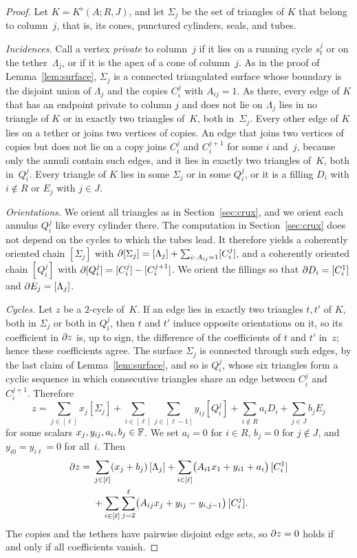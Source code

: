 \begin{proof}
Let $K=K^{\flat}(A;R,J)$, and let $\Sigma_j$ be the set of triangles of $K$ that belong to column~$j$, that is, its cones, punctured cylinders, seals, and tubes.

\emph{Incidences.}
Call a vertex \emph{private} to column~$j$ if it lies on a running cycle $s^j_t$ or on the tether~$\Lambda_j$, or if it is the apex of a cone of column~$j$.
As in the proof of Lemma~\ref{lem:surface}, $\Sigma_j$ is a connected triangulated surface whose boundary is the disjoint union of $\Lambda_j$ and the copies $C_i^j$ with $A_{ij}=1$.
As there, every edge of $K$ that has an endpoint private to column $j$ and does not lie on $\Lambda_j$ lies in no triangle of $K$ or in exactly two triangles of~$K$, both in~$\Sigma_j$.
Every other edge of $K$ lies on a tether or joins two vertices of copies.
An edge that joins two vertices of copies but does not lie on a copy joins $C_i^j$ and $C_i^{j+1}$ for some $i$ and~$j$, because only the annuli contain such edges, and it lies in exactly two triangles of~$K$, both in~$Q_i^j$.
Every triangle of $K$ lies in some $\Sigma_j$ or in some $Q_i^j$, or it is a filling $D_i$ with $i\notin R$ or $E_j$ with $j\in J$.

\emph{Orientations.}
We orient all triangles as in Section~\ref{sec:crux}, and we orient each annulus $Q_i^j$ like every cylinder there.
The computation in Section~\ref{sec:crux} does not depend on the cycles to which the tubes lead.
It therefore yields a coherently oriented chain $[\Sigma_j]$ with $\partial[\Sigma_j]=[\Lambda_j]+\sum_{i:\,A_{ij}=1}[C_i^j]$, and a coherently oriented chain $[Q_i^j]$ with $\partial[Q_i^j]=[C_i^j]-[C_i^{j+1}]$.
We orient the fillings so that $\partial D_i=[C_i^1]$ and $\partial E_j=[\Lambda_j]$.

\emph{Cycles.}
Let $z$ be a $2$-cycle of~$K$.
If an edge lies in exactly two triangles $t,t'$ of $K$, both in $\Sigma_j$ or both in $Q_i^j$, then $t$ and $t'$ induce opposite orientations on it, so its coefficient in $\partial z$ is, up to sign, the difference of the coefficients of $t$ and $t'$ in~$z$; hence these coefficients agree.
The surface $\Sigma_j$ is connected through such edges, by the last claim of Lemma~\ref{lem:surface}, and so is $Q_i^j$, whose six triangles form a cyclic sequence in which consecutive triangles share an edge between $C_i^j$ and~$C_i^{j+1}$.
Therefore
\[
  z=\sum_{j\in[\ell]}x_j[\Sigma_j]+\sum_{i\in[\ell]}\sum_{j\in[\ell-1]}y_{ij}[Q_i^j]+\sum_{i\notin R}a_iD_i+\sum_{j\in J}b_jE_j
\]
for some scalars $x_j,y_{ij},a_i,b_j\in\mathbb{F}$.
We set $a_i=0$ for $i\in R$, $b_j=0$ for $j\notin J$, and $y_{i0}=y_{i\ell}=0$ for all~$i$.
Then
\begin{align*}
  \partial z={}&\sum_{j\in[\ell]}(x_j+b_j)\,[\Lambda_j]+\sum_{i\in[\ell]}\bigl(A_{i1}x_1+y_{i1}+a_i\bigr)\,[C_i^1]\\
  &+\sum_{i\in[\ell]}\sum_{j=2}^{\ell}\bigl(A_{ij}x_j+y_{ij}-y_{i,j-1}\bigr)\,[C_i^j].
\end{align*}
The copies and the tethers have pairwise disjoint edge sets, so $\partial z=0$ holds if and only if all coefficients vanish.


\end{proof}
